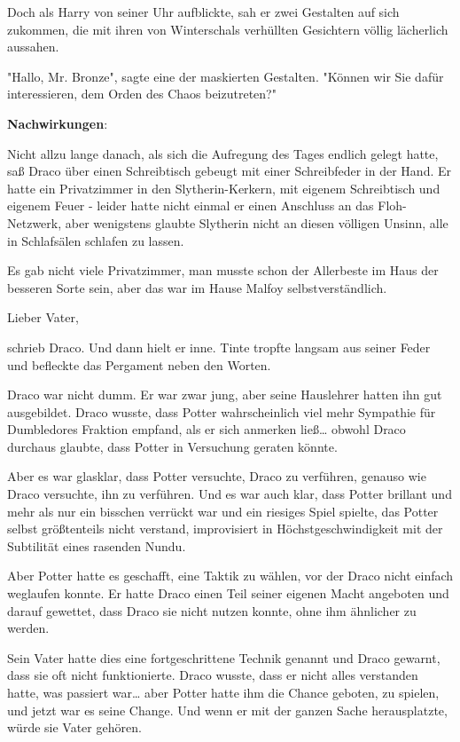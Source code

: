 {Doch als Harry von seiner Uhr aufblickte, sah er zwei Gestalten auf sich zukommen, die mit ihren von Winterschals verhüllten Gesichtern völlig lächerlich aussahen.

"Hallo, Mr. Bronze", sagte eine der maskierten Gestalten. "Können wir Sie dafür interessieren, dem Orden des Chaos beizutreten?"

\textbf{Nachwirkungen}:

Nicht allzu lange danach, als sich die Aufregung des Tages endlich gelegt hatte, saß Draco über einen Schreibtisch gebeugt mit einer Schreibfeder in der Hand. Er hatte ein Privatzimmer in den Slytherin-Kerkern, mit eigenem Schreibtisch und eigenem Feuer - leider hatte nicht einmal er einen Anschluss an das Floh-Netzwerk, aber wenigstens glaubte Slytherin nicht an diesen völligen Unsinn, alle in Schlafsälen schlafen zu lassen.

Es gab nicht viele Privatzimmer, man musste schon der Allerbeste im Haus der besseren Sorte sein, aber das war im Hause Malfoy selbstverständlich.

Lieber Vater,

schrieb Draco. Und dann hielt er inne. Tinte tropfte langsam aus seiner Feder und befleckte das Pergament neben den Worten.

Draco war nicht dumm. Er war zwar jung, aber seine Hauslehrer hatten ihn gut ausgebildet. Draco wusste, dass Potter wahrscheinlich viel mehr Sympathie für Dumbledores Fraktion empfand, als er sich anmerken ließ… obwohl Draco durchaus glaubte, dass Potter in Versuchung geraten könnte.

Aber es war glasklar, dass Potter versuchte, Draco zu verführen, genauso wie Draco versuchte, ihn zu verführen. Und es war auch klar, dass Potter brillant und mehr als nur ein bisschen verrückt war und ein riesiges Spiel spielte, das Potter selbst größtenteils nicht verstand, improvisiert in Höchstgeschwindigkeit mit der Subtilität eines rasenden Nundu.

Aber Potter hatte es geschafft, eine Taktik zu wählen, vor der Draco nicht einfach weglaufen konnte. Er hatte Draco einen Teil seiner eigenen Macht angeboten und darauf gewettet, dass Draco sie nicht nutzen konnte, ohne ihm ähnlicher zu werden.

Sein Vater hatte dies eine fortgeschrittene Technik genannt und Draco gewarnt, dass sie oft nicht funktionierte. Draco wusste, dass er nicht alles verstanden hatte, was passiert war… aber Potter hatte ihm die Chance geboten, zu spielen, und jetzt war es seine Change. Und wenn er mit der ganzen Sache herausplatzte, würde sie Vater gehören.

}
